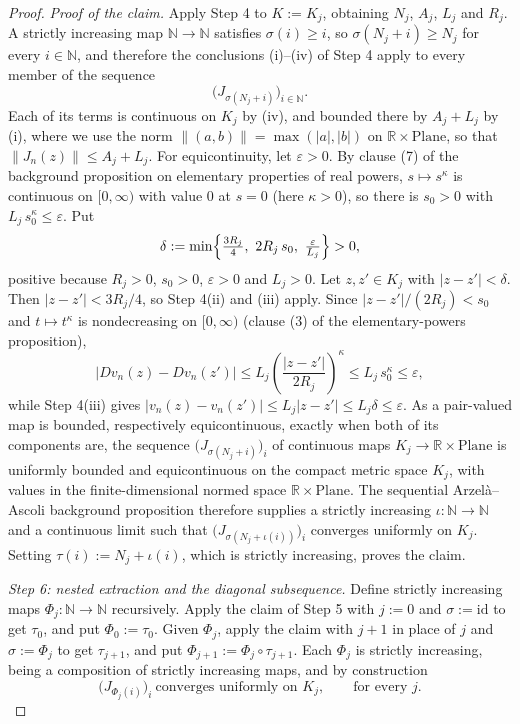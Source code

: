 \begin{proof}
\emph{Proof of the claim.}  Apply Step 4 to $K:=K_j$, obtaining $N_{j}$, $A_{j}$, $L_{j}$ and
$R_{j}$.  A strictly increasing map $\mathbb{N}\to\mathbb{N}$ satisfies $\sigma(i)\ge i$, so
$\sigma(N_{j}+i)\ge N_{j}$ for every $i\in\mathbb{N}$, and therefore the conclusions (i)--(iv) of
Step 4 apply to every member of the sequence
\[
  \bigl(J_{\sigma(N_{j}+i)}\bigr)_{i\in\mathbb{N}} .
\]
Each of its terms is continuous on $K_j$ by (iv), and bounded there by $A_{j}+L_{j}$ by (i),
where we use the norm $\lVert(a,b)\rVert=\max(\lvert a\rvert,\lvert b\rvert)$ on
$\mathbb{R}\times\mathrm{Plane}$, so that $\lVert J_n(z)\rVert\le A_{j}+L_{j}$.  For
equicontinuity, let $\varepsilon>0$.  By clause (7) of the background proposition on elementary
properties of real powers, $s\mapsto s^{\kappa}$ is continuous on $[0,\infty)$ with value $0$ at
$s=0$ (here $\kappa>0$), so there is $s_0>0$ with $L_{j}\,s_0^{\kappa}\le\varepsilon$.  Put
\[
  \delta:=\min\Bigl\{\tfrac{3R_{j}}{4},\ 2R_{j}\,s_0,\ \tfrac{\varepsilon}{L_{j}}\Bigr\}>0 ,
\]
positive because $R_{j}>0$, $s_0>0$, $\varepsilon>0$ and $L_{j}>0$.  Let $z,z'\in K_j$ with
$\lvert z-z'\rvert<\delta$.  Then $\lvert z-z'\rvert<3R_{j}/4$, so Step 4(ii) and (iii) apply.
Since $\lvert z-z'\rvert/(2R_{j})<s_0$ and $t\mapsto t^{\kappa}$ is nondecreasing on
$[0,\infty)$ (clause (3) of the elementary-powers proposition),
\[
  \lvert Dv_n(z)-Dv_n(z')\rvert
  \le L_{j}\left(\frac{\lvert z-z'\rvert}{2R_{j}}\right)^{\kappa}
  \le L_{j}\,s_0^{\kappa}\le\varepsilon ,
\]
while Step 4(iii) gives
$\lvert v_n(z)-v_n(z')\rvert\le L_{j}\lvert z-z'\rvert\le L_{j}\delta\le\varepsilon$.  As a
pair-valued map is bounded, respectively equicontinuous, exactly when both of its components
are, the sequence $\bigl(J_{\sigma(N_{j}+i)}\bigr)_i$ of continuous maps
$K_j\to\mathbb{R}\times\mathrm{Plane}$ is uniformly bounded and equicontinuous on the compact
metric space $K_j$, with values in the finite-dimensional normed space
$\mathbb{R}\times\mathrm{Plane}$.  The sequential Arzel\`a--Ascoli background proposition
therefore supplies a strictly increasing $\iota\colon\mathbb{N}\to\mathbb{N}$ and a continuous
limit such that $\bigl(J_{\sigma(N_{j}+\iota(i))}\bigr)_i$ converges uniformly on $K_j$.  Setting
$\tau(i):=N_{j}+\iota(i)$, which is strictly increasing, proves the claim.

\medskip\noindent\emph{Step 6: nested extraction and the diagonal subsequence.}
Define strictly increasing maps $\Phi_j\colon\mathbb{N}\to\mathbb{N}$ recursively.  Apply the
claim of Step 5 with $j:=0$ and $\sigma:=\mathrm{id}$ to get $\tau_0$, and put
$\Phi_0:=\tau_0$.  Given $\Phi_j$, apply the claim with $j+1$ in place of $j$ and
$\sigma:=\Phi_j$ to get $\tau_{j+1}$, and put $\Phi_{j+1}:=\Phi_j\circ\tau_{j+1}$.  Each
$\Phi_j$ is strictly increasing, being a composition of strictly increasing maps, and by
construction
\begin{equation}\label{eq:pgc-stage}
  \bigl(J_{\Phi_j(i)}\bigr)_i\ \text{converges uniformly on }K_j,\qquad\text{for every }j .
\end{equation}


\end{proof}
